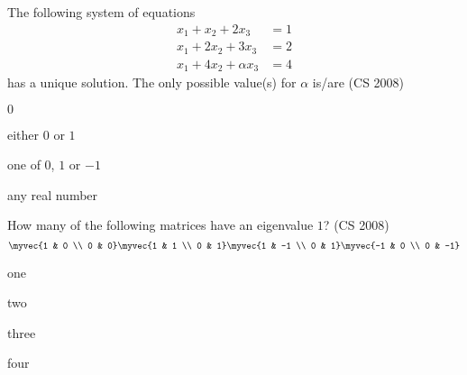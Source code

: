 \item The following system of equations
\begin{align*}
x_1 + x_2 + 2x_3 &= 1 \\
x_1 + 2x_2 + 3x_3 &= 2 \\
x_1 + 4x_2 + \alpha x_3 &= 4
\end{align*} 
has a unique solution. The only possible value(s) for \(\alpha\) is/are
\hfill (CS 2008)
\begin{enumerate}  
\begin{multicols}{2}
    \item $0$ 
    \item either $0$ or $1$ 
    \item one of $0$, $1$ or $-1$
    \item any real number
\end{multicols}
\end{enumerate}
\item How many of the following matrices have an eigenvalue $1$?
\hfill (CS 2008)
$$
\myvec{1 & 0 \\
0 & 0}
\myvec{1 & 1 \\
0 & 1}
\myvec{1 & -1 \\
0 & 1}
\myvec{-1 & 0 \\
0 & -1}
$$
\begin{enumerate}
\begin{multicols}{4}
   \item one
   \item two
   \item three
   \item four
\end{multicols}
\end{enumerate}
